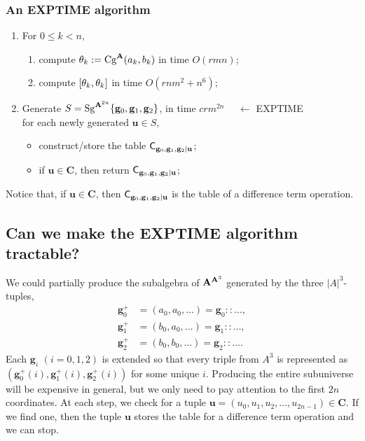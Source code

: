 \subsubsection{An {\small EXPTIME} algorithm}
 \begin{enumerate}
   \item For $0\leq k < n$,
   \begin{enumerate}
     \item compute $\theta_k:= \operatorname{Cg}^{\mathbf{A}}(a_k, b_k)$ in time $O(rmn)$;
     \item compute $[ \theta_k ,  \theta_k ]$ in time $O(rnm^2 + n^6)$;
   \end{enumerate}
\item Generate $S=\operatorname{Sg}^{\mathbf{A}^{2n}} \{\mathbf{g}_0, \mathbf{g}_1, \mathbf{g}_2\}$,
  in time $c r m^{2n}$ {\tiny {\color{red} $\quad \leftarrow$ EXPTIME}}\\
for each newly generated $\mathbf{u} \in S$,
  \begin{itemize}
  \item construct/store the table
    $\mathsf{C}_{\mathbf{g}_0, \mathbf{g}_1, \mathbf{g}_2|\mathbf{u}}$;
  \item if $\mathbf{u} \in \mathbf{C}$, then return     $\mathsf{C}_{\mathbf{g}_0, \mathbf{g}_1, \mathbf{g}_2|\mathbf{u}}$;
  \end{itemize}
\end{enumerate}
Notice that, if $\mathbf{u} \in \mathbf{C}$, then $\mathsf{C}_{\mathbf{g}_0, \mathbf{g}_1, \mathbf{g}_2|\mathbf{u}}$  is the table of a difference term operation.

\subsection{Can we make the {\small EXPTIME} algorithm tractable?}
We could partially produce the subalgebra of $\mathbf{A}^{\mathbf{A}^3}$ generated by
the three $|A|^3$-tuples,
\begin{align*}
\mathbf{g}^+_0 &= (a_0, a_0, \dots) = \mathbf{g}_0 :: \dots,\\
\mathbf{g}^+_1 &= (b_0, a_0, \dots) = \mathbf{g}_1 :: \dots,\\
\mathbf{g}^+_2 &= (b_0, b_0, \dots) = \mathbf{g}_2 :: \dots.
\end{align*}
Each $\mathbf{g}_i$ $(i=0,1,2)$ is extended so that every
triple from $A^3$ is represented as $(\mathbf{g}^+_0(i), \mathbf{g}^+_1(i), \mathbf{g}^+_2(i))$ for some
unique $i$.  Producing the entire subuniverse will be expensive in
general, but we only need to pay attention to the first $2n$ coordinates.
At each step, we check for a tuple $\mathbf{u} = (u_0, u_1, u_2, \dots, u_{2n-1})\in \mathbf{C}$.
If we find one, then the tuple $\mathbf{u}$ stores
the table for a difference term operation and we can stop.

